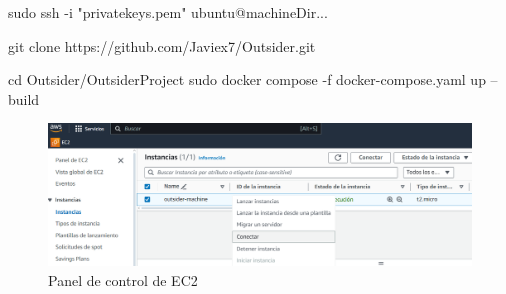 \begin{mypython}[float={h},caption={Mandatos de consola para el despliegue},label={alg:despliegue}]
	sudo ssh -i "privatekeys.pem" ubuntu@machineDir...

	git clone https://github.com/Javiex7/Outsider.git
	
	cd Outsider/OutsiderProject
	sudo docker compose -f docker-compose.yaml up --build
\end{mypython}

\begin{figure}[h]
	\centering
	\includegraphics[width=\textwidth,clip=true]{res_despliegueAWS.png}
	\caption{Panel de control de EC2}
	\label{fig:res_despliegue}
\end{figure}